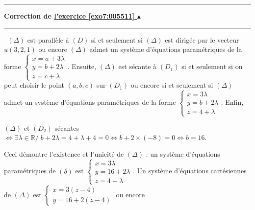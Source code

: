 \documentclass[11pt,a4paper]{article}
\newcommand{\Rr}{\mathbb{R}} \newcommand{\R}{\mathbb{R}}
\newcounter{exo}
\newcommand{\correction}[1]{\hypertarget{cor7:#1}{}\label{cor7:#1}{\bf Correction de \hyperlink{exo7:#1}{l'exercice \ref{exo7:#1} $\blacktriangle$}}\vspace{1mm}\hrule\vspace{1mm}}
\newcommand{\fincorrection}{\vspace{1mm}\hrule\vspace*{7mm}}
\begin{document}
\begin{center}
\end{center}
\fincorrection
\correction{005511}
\textbullet~$(\Delta)$ est parallèle à $(D)$ si et seulement si $(\Delta)$ est dirigée par le vecteur $u(3,2,1)$ ou encore $(\Delta)$ admet un système d'équations paramétriques de la forme $\left\{
\begin{array}{l}
x=a+3\lambda\\
y=b+2\lambda\\
z=c+\lambda
\end{array}
\right.$. Ensuite, 
$(\Delta)$ est sécante à $(D_1)$ si et seulement si on peut choisir le point $(a,b,c)$ sur $(D_1)$ ou encore si et seulement si $(\Delta)$ admet un système d'équations paramétriques de la forme $\left\{
\begin{array}{l}
x=3\lambda\\
y=b+2\lambda\\
z=4+\lambda
\end{array}
\right.$.
Enfin,

\begin{center}
$(\Delta)$ et $(D_2)$ sécantes $\Leftrightarrow\exists\lambda\in\Rr/\;b+2\lambda=4+\lambda+4=0\Leftrightarrow b+2\times(-8)=0\Leftrightarrow b=16$.
\end{center}
Ceci démontre l'existence et l'unicité de $(\Delta)$ : un système d'équations paramétriques de $(\delta)$ est $\left\{
\begin{array}{l}
x=3\lambda\\
y=16+2\lambda\\
z=4+\lambda
\end{array}
\right.$. Un système d'équations cartésiennes de $(\Delta)$ est $\left\{
\begin{array}{l}
x=3(z-4)\\
y=16+2(z-4)
\end{array}
\right.$ ou encore
\end{document}
